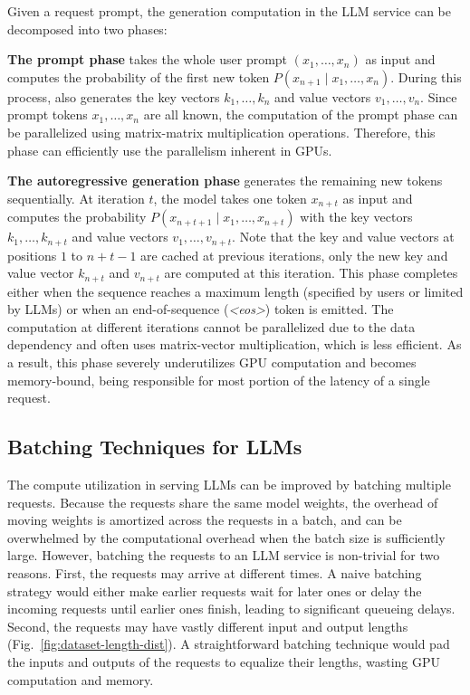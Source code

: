 Given a request prompt, the generation computation in the LLM service can be decomposed into two phases:

\textbf{The prompt phase} takes the whole user prompt $(x_1, \ldots, x_n)$ as input and computes the probability of the first new token $P(x_{n+1} \mid x_1, \ldots, x_{n})$. During this process, also generates the key vectors $k_1, \ldots, k_n$ and value vectors $v_1, \ldots, v_n$. Since prompt tokens $x_1, \ldots, x_n$ are all known, the computation of the prompt phase can be parallelized using matrix-matrix multiplication operations. Therefore, this phase can efficiently use the parallelism inherent in GPUs.

\textbf{The autoregressive generation phase} generates the remaining new tokens sequentially. At iteration $t$, the model takes one token $x_{n+t}$ as input and computes the probability $P(x_{n+t+1} \mid x_1, \ldots, x_{n+t})$ with the key vectors $k_1, \ldots, k_{n+t}$ and value vectors $v_1, \ldots, v_{n+t}$. Note that the key and value vectors at positions $1$ to $n + t - 1$ are cached at previous iterations, only the new key and value vector $k_{n+t}$ and $v_{n+t}$ are computed at this iteration. This phase completes either when the sequence reaches a maximum length (specified by users or limited by LLMs) or when an end-of-sequence (\emph{<eos>}) token is emitted. The computation at different iterations cannot be parallelized due to the data dependency and often uses matrix-vector multiplication, which is less efficient. As a result, this phase severely underutilizes GPU computation and becomes memory-bound, being responsible for most portion of the latency of a single request.

\subsection{Batching Techniques for LLMs}
\label{sec:iteration-level-scheduling}

The compute utilization in serving LLMs can be improved by batching multiple requests. Because the requests share the same model weights, the overhead of moving weights is amortized across the requests in a batch, and can be overwhelmed by the computational overhead when the batch size is sufficiently large. However, batching the requests to an LLM service is non-trivial for two reasons. First, the requests may arrive at different times. A naive batching strategy would either make earlier requests wait for later ones or delay the incoming requests until earlier ones finish, leading to significant queueing delays. Second, the requests may have vastly different input and output lengths (Fig.~\ref{fig:dataset-length-dist}).
A straightforward batching technique would pad the inputs and outputs of the requests to equalize their lengths, wasting GPU computation and memory.

